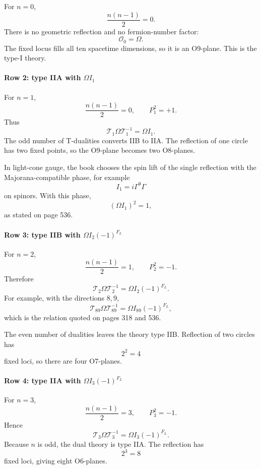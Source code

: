 \documentclass[
  10pt,
  a4paper,
  openany]{book}
\begin{document}
For \(n=0\), \[
\frac{n(n-1)}2=0.
\] There is no geometric reflection and no fermion-number factor: \[
\mathcal O_0=\Omega.
\] The fixed locus fills all ten spacetime dimensions, so it is an
O9-plane. This is the type-I theory.

\paragraph{\texorpdfstring{Row 2: type IIA with
\(\Omega I_1\)}{Row 2: type IIA with \textbackslash Omega I\_1}}\label{row-2-type-iia-with-omega-i_1}

For \(n=1\), \[
\frac{n(n-1)}2=0,
\qquad
P_1^2=+1.
\] Thus \[
\boxed{
\mathcal T_1\Omega\mathcal T_1^{-1}
=
\Omega I_1
}.
\] The odd number of T-dualities converts IIB to IIA. The reflection of
one circle has two fixed points, so the O9-plane becomes two O8-planes.

In light-cone gauge, the book chooses the spin lift of the single
reflection with the Majorana-compatible phase, for example \[
I_1=i\Gamma^9\Gamma
\] on spinors. With this phase, \[
(\Omega I_1)^2=1,
\] as stated on page 536.

\paragraph{\texorpdfstring{Row 3: type IIB with
\(\Omega I_2(-1)^{F_L}\)}{Row 3: type IIB with \textbackslash Omega I\_2(-1)\^{}\{F\_L\}}}\label{row-3-type-iib-with-omega-i_2-1f_l}

For \(n=2\), \[
\frac{n(n-1)}2=1,
\qquad
P_2^2=-1.
\] Therefore \[
\boxed{
\mathcal T_2\Omega\mathcal T_2^{-1}
=
\Omega I_2(-1)^{F_L}
}.
\] For example, with the directions \(8,9\), \[
\boxed{
\mathcal T_{89}\Omega\mathcal T_{89}^{-1}
=
\Omega I_{89}(-1)^{F_L}
},
\] which is the relation quoted on pages 318 and 536.

The even number of dualities leaves the theory type IIB. Reflection of
two circles has \[
2^2=4
\] fixed loci, so there are four O7-planes.

\paragraph{\texorpdfstring{Row 4: type IIA with
\(\Omega I_3(-1)^{F_L}\)}{Row 4: type IIA with \textbackslash Omega I\_3(-1)\^{}\{F\_L\}}}\label{row-4-type-iia-with-omega-i_3-1f_l}

For \(n=3\), \[
\frac{n(n-1)}2=3,
\qquad
P_3^2=-1.
\] Hence \[
\boxed{
\mathcal T_3\Omega\mathcal T_3^{-1}
=
\Omega I_3(-1)^{F_L}
}.
\] Because \(n\) is odd, the dual theory is type IIA. The reflection has
\[
2^3=8
\] fixed loci, giving eight O6-planes.
\end{document}
